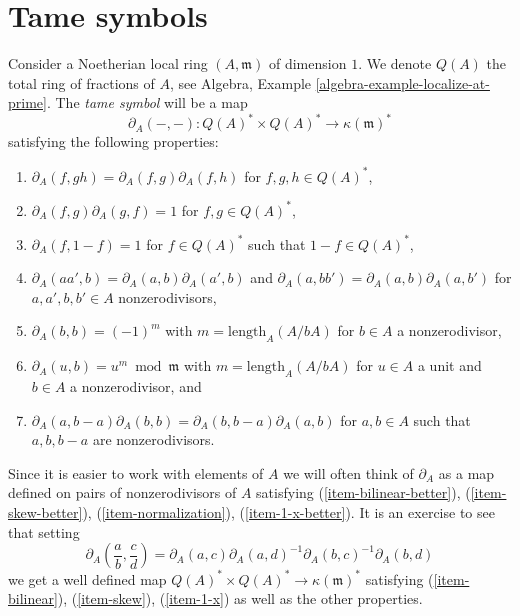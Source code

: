 \section{Tame symbols}
\label{section-tame-symbol}

\noindent
Consider a Noetherian local ring $(A, \mathfrak m)$ of dimension $1$.
We denote $Q(A)$ the total ring of fractions of $A$, see
Algebra, Example \ref{algebra-example-localize-at-prime}.
The {\it tame symbol} will be a map
$$
\partial_A(-, -) : Q(A)^* \times Q(A)^* \longrightarrow \kappa(\mathfrak m)^*
$$
satisfying the following properties:
\begin{enumerate}
\item $\partial_A(f, gh) = \partial_A(f, g) \partial_A(f, h)$
\label{item-bilinear}
for $f, g, h \in Q(A)^*$,
\item $\partial_A(f, g) \partial_A(g, f) = 1$
\label{item-skew}
for $f, g \in Q(A)^*$,
\item $\partial_A(f, 1 - f) = 1$
\label{item-1-x}
for $f \in Q(A)^*$ such that $1 - f \in Q(A)^*$,
\item $\partial_A(aa', b) = \partial_A(a, b)\partial_A(a', b)$
\label{item-bilinear-better}
and $\partial_A(a, bb') = \partial_A(a, b)\partial_A(a, b')$
for $a, a', b, b' \in A$ nonzerodivisors,
\item $\partial_A(b, b) = (-1)^m$
\label{item-skew-better}
with $m = \text{length}_A(A/bA)$
for $b \in A$ a nonzerodivisor,
\item $\partial_A(u, b) = u^m \bmod \mathfrak m$
\label{item-normalization}
with $m = \text{length}_A(A/bA)$ for $u \in A$ a unit and
$b \in A$ a nonzerodivisor, and
\item
\label{item-1-x-better}
$\partial_A(a, b - a)\partial_A(b, b) = \partial_A(b, b - a)\partial_A(a, b)$
for $a, b \in A$ such that $a, b, b - a$ are nonzerodivisors.
\end{enumerate}
Since it is easier to work with elements of $A$ we will
often think of $\partial_A$ as a map defined on pairs of
nonzerodivisors of $A$ satisfying (\ref{item-bilinear-better}),
(\ref{item-skew-better}), (\ref{item-normalization}),
(\ref{item-1-x-better}). It is an exercise to see that
setting
$$
\partial_A(\frac{a}{b}, \frac{c}{d}) =
\partial_A(a, c) \partial_A(a, d)^{-1} \partial_A(b, c)^{-1} \partial_A(b, d)
$$
we get a well defined map $Q(A)^* \times Q(A)^* \to \kappa(\mathfrak m)^*$
satisfying (\ref{item-bilinear}), (\ref{item-skew}), (\ref{item-1-x})
as well as the other properties.

